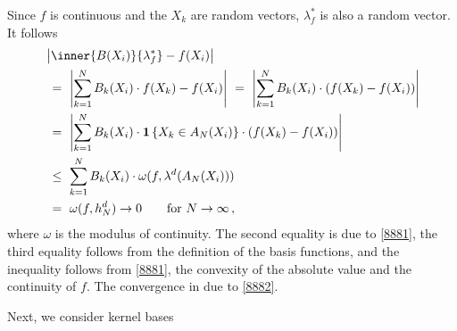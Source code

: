 \begin{example}
Since $f$ is continuous and the $X_k$ are random vectors,
$\lambda^*_f$ is also a random vector.
It follows 
\begin{align*}
  &
        \left| 
        \inner{B(X_i)}{\lambda^*_f}
        -
        f(X_i)
        \right|
        \\
  &
  \ 
        =
  \ 
        \left| 
        \sum_{k=1}^{N} 
        B_k(X_i)
        \cdot
        f(X_k)
        -
        f(X_i)
        \right|
        \ 
        =
        \ 
        \left| 
        \sum_{k=1}^{N} 
        B_k(X_i)
        \cdot
        \left( 
        f(X_k)
        -
        f(X_i)
        \right)
        \right|
\\
  &
  \ 
        =
  \ 
        \left| 
        \sum_{k=1}^{N} 
        B_k(X_i)
        \cdot
        \mathbf{1}
        \left\{ X_k\in A_N(X_i) \right\}
        \cdot
        \left( 
        f(X_k)
        -
        f(X_i)
        \right)
        \right|
        \\
  &
  \ 
        \le
  \ 
        \sum_{k=1}^{N} 
        B_k(X_i)
        \cdot
        \omega
        ( 
        f,
        \lambda^d(A_N(X_i))
        )
        \\
  &
  \ 
        =
  \ 
        \omega
        ( 
        f,
        h_N^d
        )
        \to
        0
        \qquad
        \text{for}
        \ 
        N\to\infty
        \,,
\end{align*}
where $\omega$ is the modulus of continuity.
The second equality is due to \eqref{8881}, the third equality follows from the definition of the basis functions, and 
the inequality follows from \eqref{8881}, the convexity of the absolute value and the continuity of $f$.
The convergence in due to \eqref{8882}.
\end{example}

Next, we consider kernel bases \cite[§5]{Gyorfi2002}
\begin{example}

\end{example}
